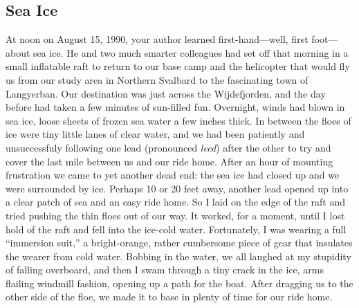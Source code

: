 \documentclass[amstex,12pt]{book}
\begin{document}
\subsection{Sea Ice}
At noon on August 15, 1990, your author learned first-hand---well, first foot---about sea ice. He and two much smarter colleagues had set off that morning in a small inflatable raft to return to our base camp and the helicopter that would fly us from our study area in Northern Svalbard to the fascinating town of Langyerban. Our destination was just across the Wijdefjorden, and the day before had taken a few minutes of sun-filled fun. Overnight, winds had blown in sea ice, loose sheets of frozen sea water a few inches thick. In between the floes of ice were tiny little lanes of clear water, and we had been patiently and unsuccessfuly following one lead (pronounced \textit{leed}) after the other to try and cover the last mile between us and our ride home. After an hour of mounting frustration we came to yet another dead end: the sea ice had closed up and we were surrounded by ice. Perhaps 10 or 20 feet away, another lead opened up into a clear patch of sea and an easy ride home. So I laid on the edge of the raft and tried pushing the thin floes out of our way. It worked, for a moment, until I lost hold of the raft and fell into the ice-cold water. Fortunately, I was wearing a full ``immersion suit,'' a bright-orange, rather cumbersome piece of gear that insulates the wearer from cold water. Bobbing in the water, we all laughed at my stupidity of falling overboard, and then I swam through a tiny crack in the ice, arms flailing windmill fashion, opening up a path for the boat. After dragging us to the other side of the floe, we made it to base in plenty of time for our ride home. \\
\end{document}
